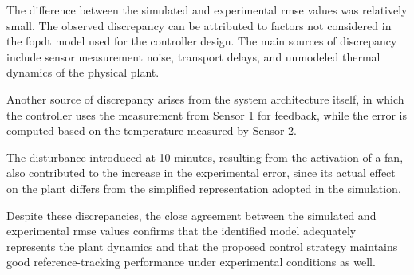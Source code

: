 The difference between the simulated and experimental \gls{rmse} values was
relatively small. The observed discrepancy can be attributed to factors not
considered in the \gls{fopdt} model used for the controller design. The main
sources of discrepancy include sensor measurement noise, transport delays, and
unmodeled thermal dynamics of the physical plant.

Another source of discrepancy arises from the system architecture itself, in
which the controller uses the measurement from Sensor 1 for feedback, while the
error is computed based on the temperature measured by Sensor 2.

The disturbance introduced at 10 minutes, resulting from the activation of a
fan, also contributed to the increase in the experimental error, since its
actual effect on the plant differs from the simplified representation adopted in
the simulation.

Despite these discrepancies, the close agreement between the simulated and
experimental \gls{rmse} values confirms that the identified model adequately
represents the plant dynamics and that the proposed control strategy maintains
good reference-tracking performance under experimental conditions as well.
